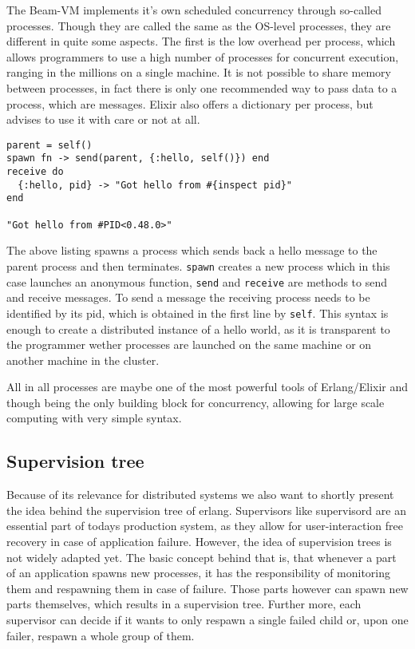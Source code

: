 \documentclass[]{paper}
\begin{document}
The Beam-VM implements it's own scheduled concurrency through so-called processes. Though they are called the same as the OS-level processes, they are different in quite some aspects. The first is the low overhead per process, which allows programmers to use a high number of processes for concurrent execution, ranging in the millions on a single machine. It is not possible to share memory between processes, in fact there is only one recommended way to pass data to a process, which are messages. Elixir also offers a dictionary per process, but advises to use it with care or not at all.

\begin{lstlisting}
parent = self()
spawn fn -> send(parent, {:hello, self()}) end
receive do
  {:hello, pid} -> "Got hello from #{inspect pid}"
end

"Got hello from #PID<0.48.0>"
\end{lstlisting}

The above listing spawns a process which sends back a hello message to the parent process and then terminates. \texttt{spawn} creates a new process which in this case launches an anonymous function, \texttt{send} and \texttt{receive} are methods to send and receive messages. To send a message the receiving process needs to be identified by its pid, which is obtained in the first line by \texttt{self}. This syntax is enough to create a distributed instance of a hello world, as it is transparent to the programmer wether processes are launched on the same machine or on another machine in the cluster. 

All in all processes are maybe one of the most powerful tools of Erlang/Elixir and though being the only building block for concurrency, allowing for large scale computing with very simple syntax.

\subsection{Supervision tree}
Because of its relevance for distributed systems we also want to shortly present the idea behind the supervision tree of erlang. Supervisors like supervisord \cite{supervisord} are an essential part of todays production system, as they allow for user-interaction free recovery in case of application failure. However, the idea of supervision trees is not widely adapted yet. The basic concept behind that is, that whenever a part of an application spawns new processes, it has the responsibility of monitoring them and respawning them in case of failure. Those parts however can spawn new parts themselves, which results in a supervision tree. Further more, each supervisor can decide if it wants to only respawn a single failed child or, upon one failer, respawn a whole group of them.
\end{document}

